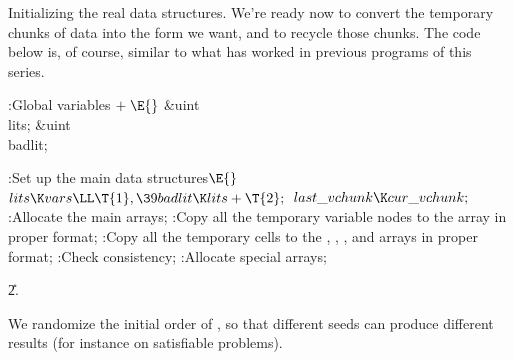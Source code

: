 Initializing the real data structures.
We're ready now to convert the temporary chunks of data into the
form we want, and to recycle those chunks. The code below is, of course,
similar to what has worked in previous programs of this series.

\Y\B\4:Global variables\X${}\mathrel+\E{}$\6
\&{uint} \\{lits};\6
\&{uint} \\{badlit};\par
\fi

\B{}:Set up the main data structures\X${}\E{}$\6
$\\{lits}\K\\{vars}\LL\T{1},\39\\{badlit}\K\\{lits}+\T{2};{}$\6
${}\\{last\_vchunk}\K\\{cur\_vchunk};{}$\6
:Allocate the main arrays\X;\6
:Copy all the temporary variable nodes to the  array in proper
format\X;\6
:Copy all the temporary cells to the , , , and  arrays in proper format\X;\6
:Check consistency\X;\6
:Allocate special arrays\X;\par
\U2.\fi

We randomize the initial order of , so that
different seeds
can produce different results (for instance on satisfiable problems).

